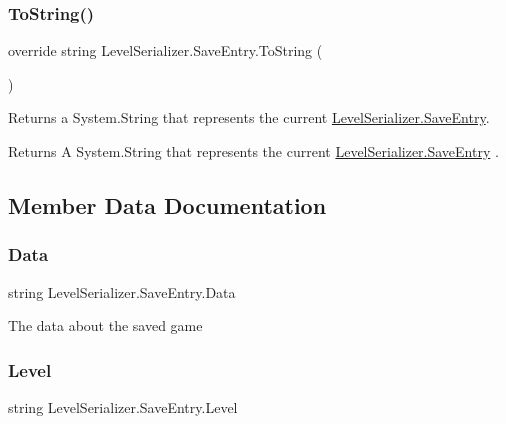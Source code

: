 \subsubsection{\texorpdfstring{To\+String()}{ToString()}}
{\footnotesize\ttfamily override string Level\+Serializer.\+Save\+Entry.\+To\+String (\begin{DoxyParamCaption}{ }\end{DoxyParamCaption})\hspace{0.3cm}{\ttfamily [inline]}}



Returns a System.\+String that represents the current \hyperlink{class_level_serializer_1_1_save_entry}{Level\+Serializer.\+Save\+Entry}. 

\begin{DoxyReturn}{Returns}
A System.\+String that represents the current \hyperlink{class_level_serializer_1_1_save_entry}{Level\+Serializer.\+Save\+Entry} . 
\end{DoxyReturn}


\subsection{Member Data Documentation}
\mbox{\label{class_level_serializer_1_1_save_entry_a64e2a1af5594210b57b9f173432a544f}} 
\subsubsection{\texorpdfstring{Data}{Data}}
{\footnotesize\ttfamily string Level\+Serializer.\+Save\+Entry.\+Data}



The data about the saved game 

\mbox{\label{class_level_serializer_1_1_save_entry_ad1db450cc75d7fe8b98b8f5c423c424a}} 
\subsubsection{\texorpdfstring{Level}{Level}}
{\footnotesize\ttfamily string Level\+Serializer.\+Save\+Entry.\+Level}




